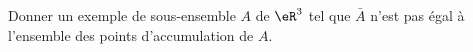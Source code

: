 \begin{exercice}\label{exoGeomAnal-0014}

	Donner un exemple de sous-ensemble $A$ de $\eR^3$ tel que $\bar A$ n'est pas égal à l'ensemble des points d'accumulation de $A$.

\end{exercice}
